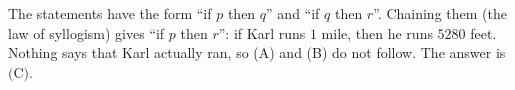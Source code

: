 The statements have the form ``if $p$ then $q$'' and ``if $q$ then $r$''. Chaining them (the law of syllogism) gives ``if $p$ then $r$'': if Karl runs $1$ mile, then he runs $5280$ feet. Nothing says that Karl actually ran, so (A) and (B) do not follow. The answer is $\boxed{\text{(C)}}$.
